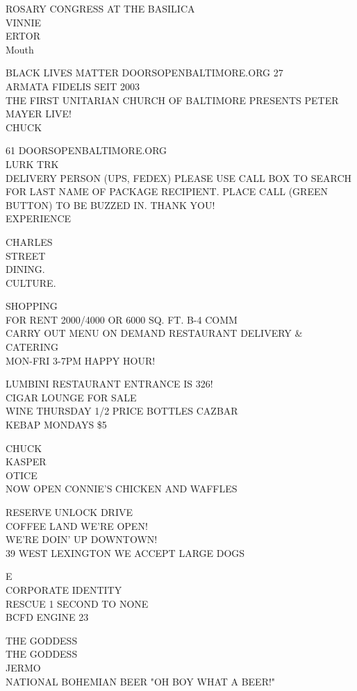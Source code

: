 \documentclass[10pt,letterpaper]{article}
\begin{document}
ROSARY CONGRESS AT THE BASILICA\\
VINNIE\\
ERTOR\\
Mouth

BLACK LIVES MATTER DOORSOPENBALTIMORE.ORG 27\\
ARMATA FIDELIS SEIT 2003\\
THE FIRST UNITARIAN CHURCH OF BALTIMORE PRESENTS PETER MAYER LIVE!\\
CHUCK

61 DOORSOPENBALTIMORE.ORG\\
LURK TRK\\
DELIVERY PERSON (UPS, FEDEX) PLEASE USE CALL BOX TO SEARCH FOR LAST NAME OF PACKAGE RECIPIENT.  PLACE CALL (GREEN BUTTON) TO BE BUZZED IN.  THANK YOU!\\
EXPERIENCE

CHARLES\\
STREET\\
DINING.\\
CULTURE.

SHOPPING\\
FOR RENT 2000/4000 OR 6000 SQ. FT. B{-}4 COMM\\
CARRY OUT MENU ON DEMAND RESTAURANT DELIVERY \& CATERING\\
MON{-}FRI 3{-}7PM HAPPY HOUR!

LUMBINI RESTAURANT ENTRANCE IS 326!\\
CIGAR LOUNGE FOR SALE\\
WINE THURSDAY 1/2 PRICE BOTTLES CAZBAR\\
KEBAP MONDAYS \$5

CHUCK\\
KASPER\\
OTICE\\
NOW OPEN CONNIE'S CHICKEN AND WAFFLES

RESERVE UNLOCK DRIVE\\
COFFEE LAND WE'RE OPEN!\\
WE'RE DOIN' UP DOWNTOWN!\\
39 WEST LEXINGTON WE ACCEPT LARGE DOGS

E\\
CORPORATE IDENTITY\\
RESCUE 1 SECOND TO NONE\\
BCFD ENGINE 23

THE GODDESS\\
THE GODDESS\\
JERMO\\
NATIONAL BOHEMIAN BEER "OH BOY WHAT A BEER!"
\end{document}
